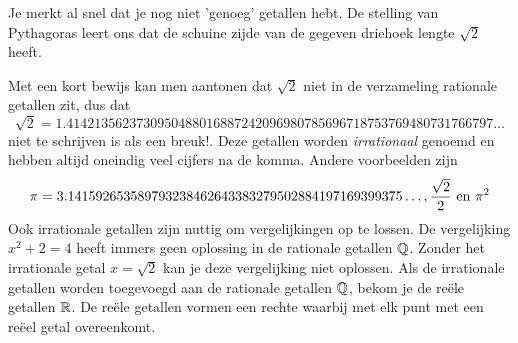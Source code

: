 \documentclass{ximera}
\begin{document}
Je merkt al snel dat je nog niet 'genoeg' getallen hebt. 
De stelling van Pythagoras 
leert ons dat de schuine zijde van de gegeven driehoek lengte \( \sqrt{2}\) heeft. 


\begin{wrapfigure}{r}{3cm} 
\end{wrapfigure}
    
Met een kort bewijs kan men aantonen dat \(\sqrt{2}\) niet in de verzameling rationale getallen zit, dus dat 
\[\sqrt{2} = 1.4142135623730950488016887242096980785696718753769480731766797\ldots%
\]  
niet te schrijven is als een breuk!. 
Deze getallen worden \textit{irrationaal} genoemd en hebben altijd oneindig veel cijfers na de komma.
%
Andere voorbeelden zijn 
\[ \pi = 3.141592653589793238462643383279502884197169399375\ldots%
,
\frac{\sqrt{2}}{2}
\Ten \pi^2 
\]
%
Ook irrationale getallen zijn nuttig om vergelijkingen op te lossen. 
De vergelijking \(x^2 + 2 = 4\) heeft immers geen oplossing in de rationale getallen \( \mathbb{Q} \).
Zonder het irrationale getal \(x = \sqrt{2} \) kan je deze vergelijking niet oplossen.
Als de irrationale getallen worden toegevoegd aan de rationale getallen \(\mathbb{Q}\), bekom je de reële getallen \(\mathbb{R}\). 
De reële getallen vormen een rechte waarbij met elk punt met een reëel getal overeenkomt. 
\end{document}

